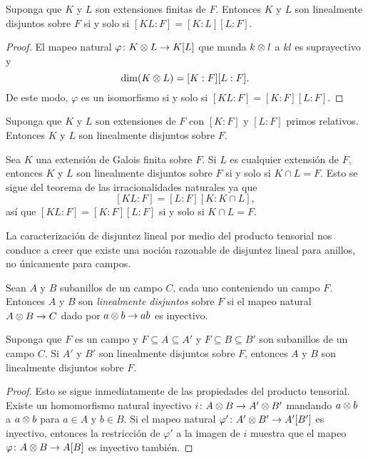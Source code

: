 \begin{lemma}
  Suponga que $K$ y $L$ son extensiones finitas de $F$. Entonces $K$ y $L$ son linealmente disjuntos sobre $F$ si y solo si $[KL:F]=[K:L][L:F]$.
\end{lemma}
\begin{proof}
  El mapeo natural $\varphi\colon K \otimes L \to K[L]$ que manda $k \otimes l$ a $kl$ es suprayectivo y
  \[
    \dim(K \otimes L) = [K:F][L:F].
  \]
  De este modo, $\varphi$ es un isomorfismo si y solo si $[KL:F]=[K:F][L:F]$.
\end{proof}

\begin{example}
  Suponga que $K$ y $L$ son extensiones de $F$ con $[K:F]$ y $[L:F]$ primos relativos. Entonces $K$ y $L$ son linealmente disjuntos sobre $F$.
\end{example}

\begin{example}
  Sea $K$ una extensión de Galois finita sobre $F$. Si $L$ es cualquier extensión de $F$, entonces $K$ y $L$ son linealmente disjuntos sobre $F$ si y solo si $K\cap L=F$. Esto se sigue del teorema de las irracionalidades naturales ya que
  \[
    [KL:F] = [L:F] [K:K\cap L],
  \]
  así que $[KL:F] = [ K:F] [L:F] $ si y solo si $K\cap L=F$.
\end{example}

La caracterización de disjuntez lineal por medio del producto tensorial nos conduce a creer que existe una noción razonable de disjuntez lineal para anillos, no únicamente para campos.

\begin{definition}
  Sean $A$ y $B$ subanillos de un campo $C$, cada uno conteniendo un campo $F$. Entonces $A$ y $B$ son \emph{linealmente disjuntos} sobre $F$ si el mapeo natural $A \otimes B \to C$ dado por $a \otimes b \to ab$ es inyectivo.
\end{definition}

\begin{lemma}
  Suponga que $F$ es un campo y $F\subseteq A\subseteq A'$ y $F\subseteq B\subseteq B'$ son subanillos de un campo $C$. Si $A'$ y $B'$ son linealmente disjuntos sobre $F$, entonces $A $ y $B$ son linealmente disjuntos sobre $F$.
\end{lemma}
\begin{proof}
  Esto se sigue inmediatamente de las propiedades del producto tensorial. Existe un homomorfismo natural inyectivo $i\colon A\otimes B \to A' \otimes B'$ mandando $a \otimes b$ a $a \otimes b$ para $a \in A$ y $b \in B$. Si el mapeo natural $\varphi'\colon A' \otimes B' \to A'[B'] $ es inyectivo, entonces la restricción de $\varphi'$ a la imagen de $i$ muestra que el mapeo $\varphi\colon A \otimes B \to A[B]  $ es inyectivo también.
\end{proof}


